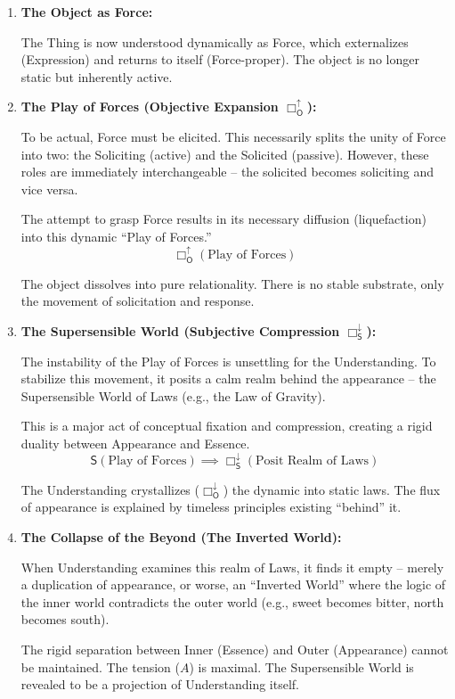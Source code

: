 \documentclass[12pt]{book}
\newcommand{\SBoxDown}{\Box_{\mathsf{S}}^{\downarrow}}
\newcommand{\OBoxUp}{\Box_{\mathsf{O}}^{\uparrow}}
\newcommand{\OBoxDown}{\Box_{\mathsf{O}}^{\downarrow}}
\begin{document}
\begin{enumerate}
\item \textbf{The Object as Force:}

The Thing is now understood dynamically as Force, which externalizes (Expression) and returns to itself (Force-proper). The object is no longer static but inherently active.

\item \textbf{The Play of Forces (Objective Expansion $\OBoxUp$):}

To be actual, Force must be elicited. This necessarily splits the unity of Force into two: the Soliciting (active) and the Solicited (passive). However, these roles are immediately interchangeable -- the solicited becomes soliciting and vice versa.

The attempt to grasp Force results in its necessary diffusion (liquefaction) into this dynamic ``Play of Forces.''
\[
\OBoxUp(\text{Play of Forces})
\]

The object dissolves into pure relationality. There is no stable substrate, only the movement of solicitation and response.

\item \textbf{The Supersensible World (Subjective Compression $\SBoxDown$):}

The instability of the Play of Forces is unsettling for the Understanding. To stabilize this movement, it posits a calm realm behind the appearance -- the Supersensible World of Laws (e.g., the Law of Gravity).

This is a major act of conceptual fixation and compression, creating a rigid duality between Appearance and Essence.
\[
\mathsf{S}(\text{Play of Forces}) \implies \SBoxDown(\text{Posit Realm of Laws})
\]

The Understanding crystallizes ($\OBoxDown$) the dynamic into static laws. The flux of appearance is explained by timeless principles existing ``behind'' it.

\item \textbf{The Collapse of the Beyond (The Inverted World):}

When Understanding examines this realm of Laws, it finds it empty -- merely a duplication of appearance, or worse, an ``Inverted World'' where the logic of the inner world contradicts the outer world (e.g., sweet becomes bitter, north becomes south).

The rigid separation between Inner (Essence) and Outer (Appearance) cannot be maintained. The tension ($A$) is maximal. The Supersensible World is revealed to be a projection of Understanding itself.


\end{enumerate}
\end{document}
